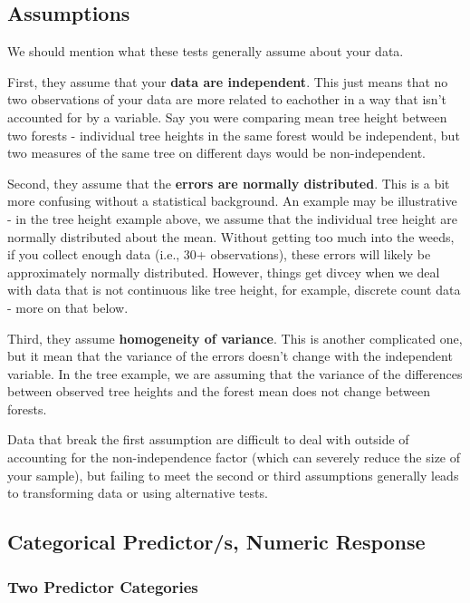 \documentclass[
  letterpaper,
  DIV=11,
  numbers=noendperiod]{scrreprt}
\begin{document}
\hypertarget{assumptions}{%
\subsection{Assumptions}\label{assumptions}}

We should mention what these tests generally assume about your data.

First, they assume that your \textbf{data are independent}. This just
means that no two observations of your data are more related to
eachother in a way that isn't accounted for by a variable. Say you were
comparing mean tree height between two forests - individual tree heights
in the same forest would be independent, but two measures of the same
tree on different days would be non-independent.

Second, they assume that the \textbf{errors are normally distributed}.
This is a bit more confusing without a statistical background. An
example may be illustrative - in the tree height example above, we
assume that the individual tree height are normally distributed about
the mean. Without getting too much into the weeds, if you collect enough
data (i.e., 30+ observations), these errors will likely be approximately
normally distributed. However, things get divcey when we deal with data
that is not continuous like tree height, for example, discrete count
data - more on that below.

Third, they assume \textbf{homogeneity of variance}. This is another
complicated one, but it mean that the variance of the errors doesn't
change with the independent variable. In the tree example, we are
assuming that the variance of the differences between observed tree
heights and the forest mean does not change between forests.

Data that break the first assumption are difficult to deal with outside
of accounting for the non-independence factor (which can severely reduce
the size of your sample), but failing to meet the second or third
assumptions generally leads to transforming data or using alternative
tests.

\hypertarget{categorical-predictors-numeric-response}{%
\subsection{Categorical Predictor/s, Numeric
Response}\label{categorical-predictors-numeric-response}}

\hypertarget{sec-ttest}{%
\subsubsection{Two Predictor Categories}\label{sec-ttest}}
\end{document}
